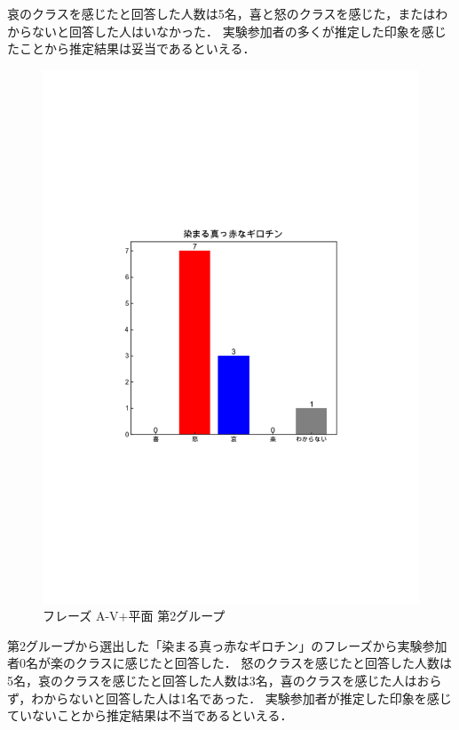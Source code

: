 哀のクラスを感じたと回答した人数は5名，喜と怒のクラスを感じた，またはわからないと回答した人はいなかった．
実験参加者の多くが推定した印象を感じたことから推定結果は妥当であるといえる．
\newpage
\begin{figure}[H]
    \centering
    \includegraphics[width=14cm]{4311.pdf}
    \vspace{-1mm}
    \caption{フレーズ A-V+平面 第2グループ}
    \label{fig:mms}
    \vspace{5mm}
\end{figure}
第2グループから選出した「染まる真っ赤なギロチン」のフレーズから実験参加者0名が楽のクラスに感じたと回答した．
怒のクラスを感じたと回答した人数は5名，哀のクラスを感じたと回答した人数は3名，喜のクラスを感じた人はおらず，わからないと回答した人は1名であった．
実験参加者が推定した印象を感じていないことから推定結果は不当であるといえる．
\newpage
